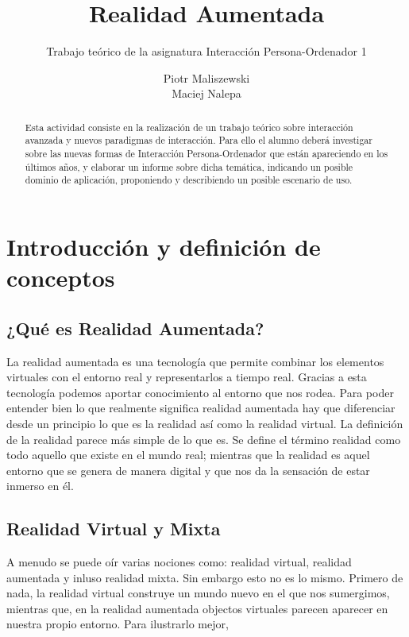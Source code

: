 \documentclass[a4paper,11pt]{scrartcl}
\title{Realidad Aumentada}
\subtitle{Trabajo teórico de la asignatura Interacción Persona-Ordenador 1}
\author{Piotr Maliszewski\\Maciej Nalepa}
\begin{document}
\maketitle

\begin{abstract}

Esta actividad consiste en la realización de un trabajo teórico sobre interacción avanzada y
nuevos paradigmas de interacción. Para ello el alumno deberá investigar sobre las nuevas
formas de Interacción Persona-Ordenador que están apareciendo en los últimos años, y elaborar un
informe sobre dicha temática, indicando un posible dominio de aplicación, proponiendo y
describiendo un posible escenario de uso.

\end{abstract}

\section{Introducción y definición de conceptos}
\subsection{¿Qué es Realidad Aumentada?}
La realidad aumentada es una tecnología que permite combinar los elementos virtuales con el entorno real y representarlos a tiempo real. Gracias a esta tecnología podemos aportar conocimiento al entorno que nos rodea. Para poder entender bien lo que realmente significa realidad aumentada hay que diferenciar desde un principio lo que es la realidad así como la realidad virtual. La definición de la realidad parece más simple de lo que es. Se define el término realidad como todo aquello que existe en el mundo real; mientras que la realidad es aquel entorno que se genera de manera digital y que nos da la sensación de estar inmerso en él.


\subsection{Realidad Virtual y Mixta}
A menudo se puede oír varias nociones como: realidad virtual, realidad aumentada y inluso realidad mixta. Sin embargo esto no es lo mismo. Primero de nada, la realidad virtual construye un mundo nuevo en el que nos sumergimos, mientras que, en la realidad aumentada objectos virtuales parecen aparecer en nuestra propio entorno. Para ilustrarlo mejor,
\end{document}
